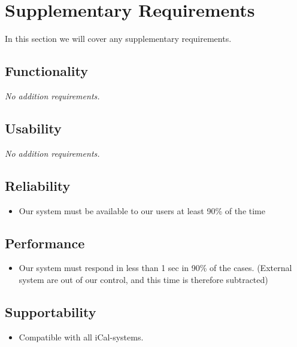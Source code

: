\section{Supplementary Requirements}
In this section we will cover any supplementary requirements.
\subsection{Functionality}
\textit{No addition requirements.}
\subsection{Usability}
\textit{No addition requirements.}
\subsection{Reliability}
\begin{itemize}
  \item Our system must be available to our users at least 90\% of the time
\end{itemize}
\subsection{Performance}
\begin{itemize}
  \item Our system must respond in less than 1 sec in 90\% of the cases.
    (External system are out of our control, and this time is therefore
    subtracted)
\end{itemize}
\subsection{Supportability}
\begin{itemize}
  \item Compatible with all iCal-systems.
\end{itemize}
